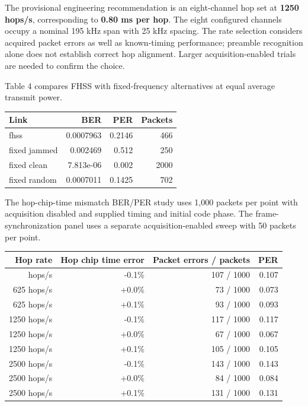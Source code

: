 \documentclass[
]{article}
\newcounter{none} %
\begin{document}
The provisional engineering recommendation is an eight-channel hop set
at \textbf{1250 hops/s}, corresponding to \textbf{0.80 ms per hop}. The
eight configured channels occupy a nominal 195 kHz span with 25 kHz
spacing. The rate selection considers acquired packet errors as well as
known-timing performance; preamble recognition alone does not establish
correct hop alignment. Larger acquisition-enabled trials are needed to
confirm the choice.

Table 4 compares FHSS with fixed-frequency alternatives at equal average
transmit power.

{\def\LTcaptype{none} %
\begin{longtable}[]{@{}lrrr@{}}
\toprule\noalign{}
Link & BER & PER & Packets \\
\midrule\noalign{}
\endhead
\bottomrule\noalign{}
\endlastfoot
fhss & 0.0007963 & 0.2146 & 466 \\
fixed jammed & 0.002469 & 0.512 & 250 \\
fixed clean & 7.813e-06 & 0.002 & 2000 \\
fixed random & 0.0007011 & 0.1425 & 702 \\
\end{longtable}
}

The hop-chip-time mismatch BER/PER study uses 1,000 packets per point
with acquisition disabled and supplied timing and initial code phase.
The frame-synchronization panel uses a separate acquisition-enabled
sweep with 50 packets per point.

{\def\LTcaptype{none} %
\begin{longtable}[]{@{}rrrr@{}}
\toprule\noalign{}
Hop rate & Hop chip time error & Packet errors / packets & PER \\
\midrule\noalign{}
\endhead
\bottomrule\noalign{}
\endlastfoot
625 hops/s & -0.1\% & 107 / 1000 & 0.107 \\
625 hops/s & +0.0\% & 73 / 1000 & 0.073 \\
625 hops/s & +0.1\% & 93 / 1000 & 0.093 \\
1250 hops/s & -0.1\% & 117 / 1000 & 0.117 \\
1250 hops/s & +0.0\% & 67 / 1000 & 0.067 \\
1250 hops/s & +0.1\% & 105 / 1000 & 0.105 \\
2500 hops/s & -0.1\% & 143 / 1000 & 0.143 \\
2500 hops/s & +0.0\% & 84 / 1000 & 0.084 \\
2500 hops/s & +0.1\% & 131 / 1000 & 0.131 \\
\end{longtable}
}
\end{document}
